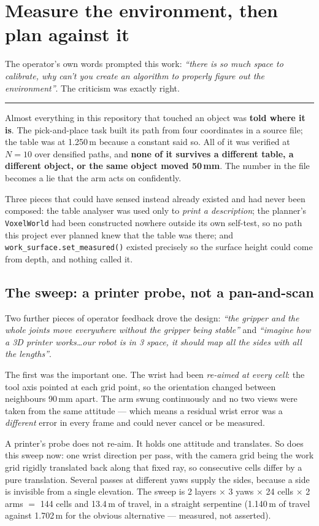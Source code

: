 \documentclass[11pt,a4paper,oneside]{report}
\newcommand{\code}[1]{\texttt{\small #1}}
\newcommand{\keyfact}[1]{%
  \par\vspace{7pt}\noindent
  \hspace*{0pt}\textcolor{srlblue}{\rule{2.5pt}{\dimexpr\baselineskip\relax}}%
  \hspace{9pt}%
  \begin{minipage}[t]{\dimexpr\textwidth-14pt\relax}
  \small #1
  \end{minipage}\par\vspace{7pt}}
\begin{document}
\section{Measure the environment, then plan against it}

The operator's own words prompted this work: \emph{``there is so much space to
calibrate, why can't you create an algorithm to properly figure out the
environment''}. The criticism was exactly right.

\keyfact{Almost everything in this repository that touched an object was
\textbf{told where it is}. The pick-and-place task built its path from four
coordinates in a source file; the table was at 1.250\,m because a constant said
so. All of it was verified at $N=10$ over densified paths, and \textbf{none of
it survives a different table, a different object, or the same object moved
50\,mm}. The number in the file becomes a lie that the arm acts on
confidently.}

Three pieces that could have sensed instead already existed and had never been
composed: the table analyser was used only to \emph{print a description}; the
planner's \code{VoxelWorld} had been constructed nowhere outside its own
self-test, so no path this project ever planned knew that the table was there;
and \code{work\_surface.set\_measured()} existed precisely so the surface height
could come from depth, and nothing called it.

\subsection{The sweep: a printer probe, not a pan-and-scan}

Two further pieces of operator feedback drove the design: \emph{``the gripper
and the whole joints move everywhere without the gripper being stable''} and
\emph{``imagine how a 3D printer works\ldots our robot is in 3 space, it should
map all the sides with all the lengths''}.

The first was the important one. The wrist had been \emph{re-aimed at every
cell}: the tool axis pointed at each grid point, so the orientation changed
between neighbours 90\,mm apart. The arm swung continuously and no two views
were taken from the same attitude --- which means a residual wrist error was a
\emph{different} error in every frame and could never cancel or be measured.

A printer's probe does not re-aim. It holds one attitude and translates. So
does this sweep now: one wrist direction per pass, with the camera grid being
the work grid rigidly translated back along that fixed ray, so consecutive
cells differ by a pure translation. Several passes at different yaws supply the
sides, because a side is invisible from a single elevation. The sweep is
2 layers $\times$ 3 yaws $\times$ 24 cells $\times$ 2 arms $=$ 144 cells and
13.4\,m of travel, in a straight serpentine (1.140\,m of travel against 1.702\,m
for the obvious alternative --- measured, not asserted).
\end{document}
